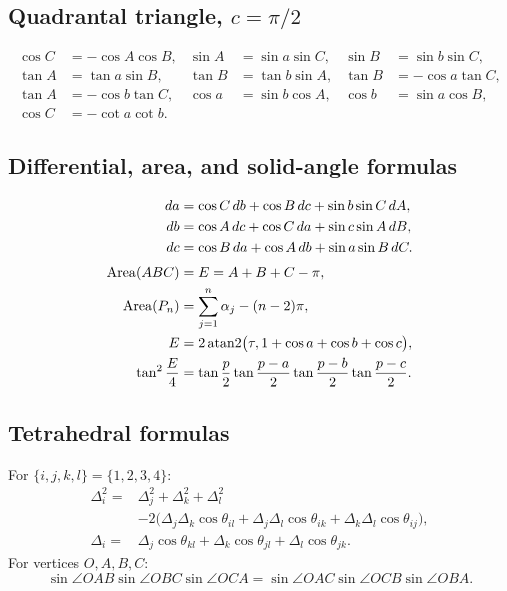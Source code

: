\subsection{Quadrantal triangle, \(c=\pi/2\)}

\begin{align*}
\cos C&=-\cos A\cos B,&
\sin A&=\sin a\sin C,&
\sin B&=\sin b\sin C,\\
\tan A&=\tan a\sin B,&
\tan B&=\tan b\sin A,&
\tan B&=-\cos a\tan C,\\
\tan A&=-\cos b\tan C,&
\cos a&=\sin b\cos A,&
\cos b&=\sin a\cos B,\\
\cos C&=-\cot a\cot b.&&
\end{align*}

\subsection{Differential, area, and solid-angle formulas}

\begin{align*}
da&=\cos C\,db+\cos B\,dc+\sin b\sin C\,dA,\\
db&=\cos A\,dc+\cos C\,da+\sin c\sin A\,dB,\\
dc&=\cos B\,da+\cos A\,db+\sin a\sin B\,dC.\\[0.3em]
\operatorname{Area}(ABC)&=E=A+B+C-\pi,\\
\operatorname{Area}(P_n)&=\sum_{j=1}^n\alpha_j-(n-2)\pi,\\
E&=2\operatorname{atan2}\bigl(\tau,1+\cos a+\cos b+\cos c\bigr),\\
\tan^2\frac E4&=
 \tan\frac p2\tan\frac{p-a}{2}\tan\frac{p-b}{2}\tan\frac{p-c}{2}.
\end{align*}

\subsection{Tetrahedral formulas}

For \(\{i,j,k,l\}=\{1,2,3,4\}\):
\begin{align*}
\Delta_i^2={}&\Delta_j^2+\Delta_k^2+\Delta_l^2\\
&-2\bigl(\Delta_j\Delta_k\cos\theta_{il}
+\Delta_j\Delta_l\cos\theta_{ik}
+\Delta_k\Delta_l\cos\theta_{ij}\bigr),\\
\Delta_i={}&\Delta_j\cos\theta_{kl}
+\Delta_k\cos\theta_{jl}
+\Delta_l\cos\theta_{jk}.
\end{align*}
For vertices \(O,A,B,C\):
\[
\sin\angle OAB\sin\angle OBC\sin\angle OCA
=\sin\angle OAC\sin\angle OCB\sin\angle OBA.
\]
